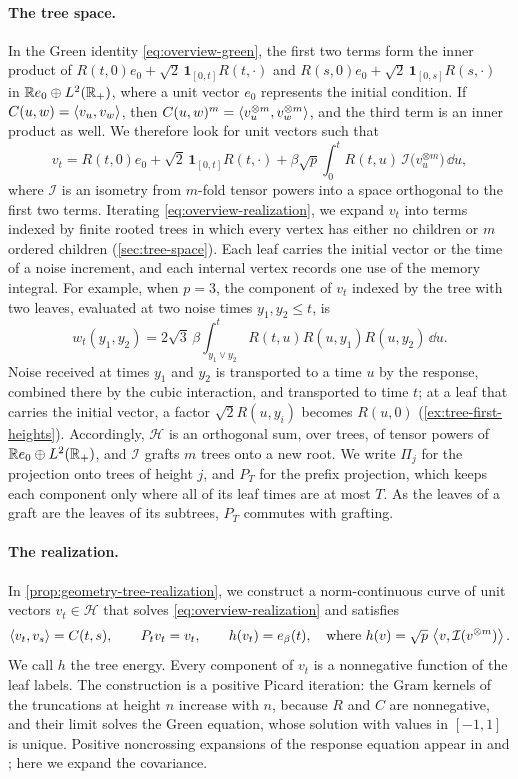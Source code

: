 \paragraph{The tree space.}
In the Green identity \eqref{eq:overview-green}, the first two terms form the inner product of $R(t,0)e_0+\sqrt2\,\mathbf1_{[0,t]}R(t,\cdot)$ and $R(s,0)e_0+\sqrt2\,\mathbf1_{[0,s]}R(s,\cdot)$ in $\mathbb R e_0\oplus L^2(\mathbb R_+)$, where a unit vector $e_0$ represents the initial condition. If $C(u,w)=\left\langle v_u,v_w\right\rangle$, then $C(u,w)^m=\left\langle v_u^{\otimes m},v_w^{\otimes m}\right\rangle$, and the third term is an inner product as well. We therefore look for unit vectors such that
\begin{equation}\label{eq:overview-realization}
 v_t=R(t,0)e_0+\sqrt2\,\mathbf1_{[0,t]}R(t,\cdot)
 +\beta\sqrt p\int_0^tR(t,u)\,\mathcal I\bigl(v_u^{\otimes m}\bigr)\,\dd u,
\end{equation}
where $\mathcal I$ is an isometry from $m$-fold tensor powers into a space orthogonal to the first two terms. Iterating \eqref{eq:overview-realization}, we expand $v_t$ into terms indexed by finite rooted trees in which every vertex has either no children or $m$ ordered children (\cref{sec:tree-space}). Each leaf carries the initial vector or the time of a noise increment, and each internal vertex records one use of the memory integral. For example, when $p=3$, the component of $v_t$ indexed by the tree with two leaves, evaluated at two noise times $y_1,y_2\le t$, is
\[
 w_t(y_1,y_2)=2\sqrt3\,\beta\int_{y_1\vee y_2}^tR(t,u)R(u,y_1)R(u,y_2)\,\dd u .
\]
Noise received at times $y_1$ and $y_2$ is transported to a time $u$ by the response, combined there by the cubic interaction, and transported to time $t$; at a leaf that carries the initial vector, a factor $\sqrt2R(u,y_i)$ becomes $R(u,0)$ (\cref{ex:tree-first-heights}). Accordingly, $\mathcal H$ is an orthogonal sum, over trees, of tensor powers of $\mathbb R e_0\oplus L^2(\mathbb R_+)$, and $\mathcal I$ grafts $m$ trees onto a new root. We write $\Pi_j$ for the projection onto trees of height $j$, and $P_T$ for the prefix projection, which keeps each component only where all of its leaf times are at most $T$. As the leaves of a graft are the leaves of its subtrees, $P_T$ commutes with grafting.

\paragraph{The realization.}
In \cref{prop:geometry-tree-realization}, we construct a norm-continuous curve of unit vectors $v_t\in\mathcal H$ that solves \eqref{eq:overview-realization} and satisfies
\[
 \left\langle v_t,v_s\right\rangle=C(t,s),\qquad P_tv_t=v_t,\qquad
 h(v_t)=e_\beta(t),\quad\text{where }h(v)=\sqrt p\,\left\langle v,\mathcal I(v^{\otimes m})\right\rangle.
\]
We call $h$ the tree energy. Every component of $v_t$ is a nonnegative function of the leaf labels. The construction is a positive Picard iteration: the Gram kernels of the truncations at height $n$ increase with $n$, because $R$ and $C$ are nonnegative, and their limit solves the Green equation, whose solution with values in $[-1,1]$ is unique. Positive noncrossing expansions of the response equation appear in \cite[Section~2.1]{guionnetmazza2005} and \cite[Section~2]{dgm2007}; here we expand the covariance.

